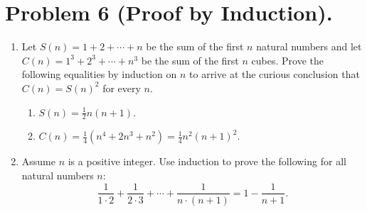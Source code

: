 \documentclass{../homework}
\begin{document}
\clearpage
\section{Problem 6 (Proof by Induction).}
\begin{enumerate}
    \item Let $S(n) = 1 + 2 + \cdots + n$ be the sum of the first $n$ natural numbers and let $C(n) = 1^3 + 2^3 + \cdots + n^3$ be the sum of the first $n$ cubes. Prove the following equalities by induction on $n$ to arrive at the curious conclusion that $C(n) = S(n)^2$ for every $n$.
    \begin{enumerate}
        \item $S(n) = \frac{1}{2} n (n+1)$.

        \item $C(n) = \frac{1}{4}(n^4 + 2n^3 + n^2) = \frac{1}{4}n^2(n+1)^2$.

    \end{enumerate} 
    \item Assume $n$ is a positive integer. Use induction to prove the following for all natural numbers $n$: 
    \[
        \frac{1}{1\cdot2} +  \frac{1}{2\cdot3} + \cdots +  \frac{1}{n\cdot(n+1)} = 1 - \frac{1}{n+1}.
    \]

\end{enumerate}

\end{document}
